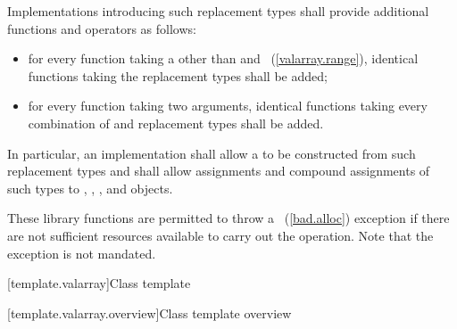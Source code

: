 \pnum
Implementations introducing such replacement types shall provide
additional functions and operators as follows:
\begin{itemize}
\item
for every function taking a
 other than  and
~(\ref{valarray.range}),
identical functions taking the replacement types shall be added;
\item
for every function taking two
arguments, identical functions taking every combination of
and replacement types shall be added.
\end{itemize}

\pnum
In particular, an implementation shall allow a
to be constructed from such replacement types and shall allow assignments
and compound assignments of such types to
,
,
,
and
objects.

\pnum
These library functions are permitted to throw a
~(\ref{bad.alloc}) exception if there are not sufficient resources available
to carry out the operation.
Note that the exception is not mandated.

[template.valarray]{Class template }

[template.valarray.overview]{Class template  overview}

